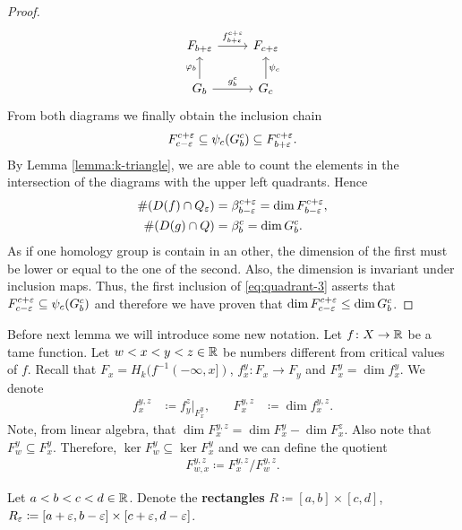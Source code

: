 \begin{proof}
\begin{equation}
\begin{tikzcd}
        F_{b+\e} \arrow[r, "f_{b+\e}^{c+\e}"]
        & F_{c+\e} \\
        G_b \arrow[r, "g_b^c"] \arrow[u, "\varphi_{b}"]
        & G_c \arrow[u, "\psi_c"']        
    \end{tikzcd}
    \end{equation}
    From both diagrams we finally obtain the inclusion chain
    \begin{align}  \label{eq:quadrant-3}
        F_{c-\varepsilon}^{c+\varepsilon} \subseteq \psi_c (G_b^c) \subseteq F_{b+\varepsilon}^{c+\varepsilon}.
    \end{align}
    By Lemma \ref{lemma:k-triangle}, we are able to count the elements in the intersection of the diagrams with the upper left quadrants. Hence
    \begin{align}
        \#(D(f) \cap Q_\varepsilon) &= \beta_{b-\varepsilon}^{c+\varepsilon} = \dim F_{b-\varepsilon}^{c+\varepsilon}, \\
        \#(D(g) \cap Q) &= \beta_b^c = \dim G_b^c.
    \end{align}
    As if one homology group is contain in an other, the dimension of the first must be lower or equal to the one of the second. Also, the dimension is invariant under inclusion maps. Thus, the first inclusion of \eqref{eq:quadrant-3} asserts that $ F_{c-\varepsilon}^{c+\varepsilon} \subseteq \psi_c (G_b^c) $ and therefore we have proven that $ \dim F_{c-\varepsilon}^{c+\varepsilon} \leq  \dim G_b^c $.
\end{proof}

Before next lemma we will introduce some new notation. Let $ f\colon X \to \mathbb R $ be a tame function. Let $ w < x < y < z \in \mathbb R $ be numbers different from critical values of $ f $. Recall that $ F_x = H_k(f^{-1}(-\infty, x]) $, $ f_x^y \colon F_x \to F_y $ and $ F_x^y = \dim f_x^y $. We denote
\begin{align}
    f_x^{y, z} &\coloneq f_y^z \rvert_{F_x^y},
    \quad &
    F_x^{y, z} &\coloneq \dim f_x^{y, z}.
\end{align}
Note, from linear algebra, that $ \dim F_x^{y,z} = \dim F_x^y - \dim F_x^z $. Also note that $ F_w^y \subseteq F_x^y $. Therefore, $ \ker F_w^y \subseteq \ker F_x^y $ and we can define the quotient
\begin{align}
    F_{w,x}^{y,z} \coloneq F_x^{y,z} / F_w^{y,z}.
\end{align}

Let $ a < b < c < d \in \mathbb R $. Denote the {\bf rectangles} $ R \coloneq [a, b] \times [c, d] $, $ R_\varepsilon \coloneq [a+\varepsilon, b-\varepsilon] \times [c+\varepsilon, d -\varepsilon] $.

